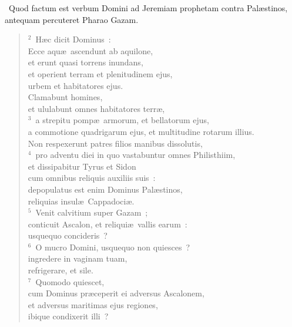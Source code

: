 ~\lettrine[lines=10,image=true,loversize=0.05,lraise=-0.03]{Q}{}uod factum est verbum Domini ad Jeremiam prophetam contra Pal\ae stinos, antequam percuteret Pharao Gazam.
\begin{flushleft}\begin{verse}\vspace{6pt}${}^{2}$~H\ae c dicit Dominus~:\\ Ecce aqu\ae\ ascendunt ab aquilone,\\ et erunt quasi torrens inundans,\\ et operient terram et plenitudinem ejus,\\ urbem et habitatores ejus.\\ Clamabunt homines,\\ et ululabunt omnes habitatores terr\ae ,\\
${}^{3}$~a strepitu pomp\ae\ armorum, et bellatorum ejus,\\ a commotione quadrigarum ejus, et multitudine rotarum illius.\\ Non respexerunt patres filios manibus dissolutis,\\
${}^{4}$~pro adventu diei in quo vastabuntur omnes Philisthiim,\\ et dissipabitur Tyrus et Sidon\\ cum omnibus reliquis auxiliis suis~:\\ depopulatus est enim Dominus Pal\ae stinos,\\ reliquias insul\ae\ Cappadoci\ae .\\
${}^{5}$~Venit calvitium super Gazam~;\\ conticuit Ascalon, et reliqui\ae\ vallis earum~:\\ usquequo concideris~?\\
${}^{6}$~O mucro Domini, usquequo non quiesces~?\\ ingredere in vaginam tuam,\\ refrigerare, et sile.\\
${}^{7}$~Quomodo quiescet,\\ cum Dominus pr\ae ceperit ei adversus Ascalonem,\\ et adversus maritimas ejus regiones,\\ ibique condixerit illi~?\end{verse}\end{flushleft}


